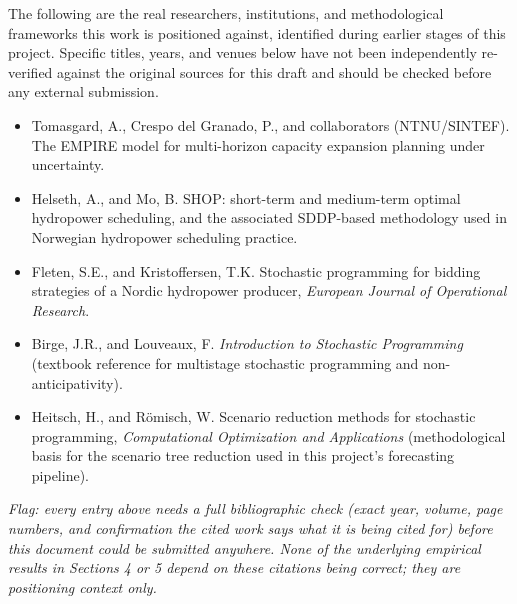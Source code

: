 \documentclass[11pt]{article}
\begin{document}
The following are the real researchers, institutions, and methodological frameworks this work is positioned against, identified during earlier stages of this project. Specific titles, years, and venues below have not been independently re-verified against the original sources for this draft and should be checked before any external submission.

\begin{itemize}
\item Tomasgard, A., Crespo del Granado, P., and collaborators (NTNU/SINTEF). The EMPIRE model for multi-horizon capacity expansion planning under uncertainty.
\item Helseth, A., and Mo, B. SHOP: short-term and medium-term optimal hydropower scheduling, and the associated SDDP-based methodology used in Norwegian hydropower scheduling practice.
\item Fleten, S.E., and Kristoffersen, T.K. Stochastic programming for bidding strategies of a Nordic hydropower producer, \emph{European Journal of Operational Research}.
\item Birge, J.R., and Louveaux, F. \emph{Introduction to Stochastic Programming} (textbook reference for multistage stochastic programming and non-anticipativity).
\item Heitsch, H., and R\"omisch, W. Scenario reduction methods for stochastic programming, \emph{Computational Optimization and Applications} (methodological basis for the scenario tree reduction used in this project's forecasting pipeline).
\end{itemize}

\emph{Flag: every entry above needs a full bibliographic check (exact year, volume, page numbers, and confirmation the cited work says what it is being cited for) before this document could be submitted anywhere. None of the underlying empirical results in Sections 4 or 5 depend on these citations being correct; they are positioning context only.}
\end{document}
